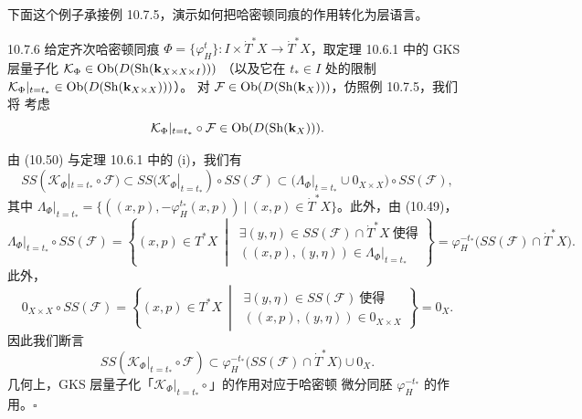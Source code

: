 下面这个例子承接例 10.7.5，演示如何把哈密顿同痕的作用转化为层语言。

\begin{wexam}{10.7.6}
  给定齐次哈密顿同痕 $\Phi=\{\varphi_H^t\}\colon I\times\dot T^*X
  \to\dot T^*X$，取定理 10.6.1 中的 GKS 层量子化
  $\mathcal K_\Phi\in\operatorname{Ob}(D(\operatorname{Sh}(\mathbf{k}_{X\times X\times I})))$
  （以及它在 $t_*\in I$ 处的限制
  $\mathcal K_\Phi|_{t=t_*}\in\operatorname{Ob}(D(\operatorname{Sh}(\mathbf{k}_{X\times X})))$）。
  对 $\mathcal F\in\operatorname{Ob}(D(\operatorname{Sh}(\mathbf{k}_X)))$，仿照例 10.7.5，我们将
  考虑
  \[
    \mathcal K_\Phi|_{t=t_*}\circ\mathcal F
    \in\operatorname{Ob}(D(\operatorname{Sh}(\mathbf{k}_X))).
  \]
\end{wexam}

由 (10.50) 与定理 10.6.1 中的 (i)，我们有
\[
  SS(\mathcal K_\Phi|_{t=t_*}\circ\mathcal F)
  \subset SS(\mathcal K_\Phi|_{t=t_*})\circ SS(\mathcal F)
  \subset\bigl(\Lambda_\Phi|_{t=t_*}\cup0_{X\times X}\bigr)\circ SS(\mathcal F),
\]
其中
$\Lambda_\Phi|_{t=t_*}=\bigl\{((x,p),-\varphi_H^{t_*}(x,p))\ \big|\
(x,p)\in\dot T^*X\bigr\}$。此外，由 (10.49)，
\[
  \Lambda_\Phi|_{t=t_*}\circ SS(\mathcal F)
  =\left\{(x,p)\in T^*X\ \middle|\
  \begin{array}{l}
    \exists(y,\eta)\in SS(\mathcal F)\cap\dot T^*X\ \text{使得}\\
    ((x,p),(y,\eta))\in\Lambda_\Phi|_{t=t_*}
  \end{array}\right\}
  =\varphi_H^{-t_*}\bigl(SS(\mathcal F)\cap\dot T^*X\bigr).
\]
此外，
\[
  0_{X\times X}\circ SS(\mathcal F)
  =\left\{(x,p)\in T^*X\ \middle|\
  \begin{array}{l}
    \exists(y,\eta)\in SS(\mathcal F)\ \text{使得}\\
    ((x,p),(y,\eta))\in0_{X\times X}
  \end{array}\right\}=0_X.
\]
因此我们断言
\begin{equation}\tag{10.51}
  SS(\mathcal K_\Phi|_{t=t_*}\circ\mathcal F)
  \subset\varphi_H^{-t_*}\bigl(SS(\mathcal F)\cap\dot T^*X\bigr)\cup0_X.
\end{equation}
几何上，GKS 层量子化「$\mathcal K_\Phi|_{t=t_*}\circ$」的作用对应于哈密顿
微分同胚 $\varphi_H^{-t_*}$ 的作用。\hfill$\square$
